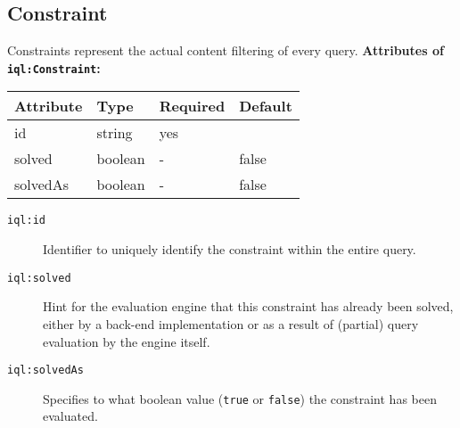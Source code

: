 \documentclass[11pt]{article}
\newcommand{\iqlns}{iql:}
\newcommand{\iqlType}[1]{\texttt{\iqlns#1}}
\newcommand{\attributes}[1]{\noindent\textbf{Attributes of \iqlType{#1}:}\newline\medskip}
\newcommand{\desc}[1]{\noindent#1\newline\medskip}
\begin{document}
\subsection{Constraint}
\label{sec:json-ld-constraint}
\desc{Constraints represent the actual content filtering of every query.}
\attributes{Constraint}
\begin{tabular}{|p{}|p{}|p{}|p{}|}
	\hline
	\textbf{Attribute} & \textbf{Type} & \textbf{Required} & \textbf{Default} \\ 
	\hline
	\hline
	id & string & yes &  \\ 
	\hline 
	solved & boolean & - & false \\ 
	\hline 
	solvedAs & boolean & - & false \\ 
	\hline 
\end{tabular}
\begin{description}
\item[\iqlType{id}] Identifier to uniquely identify the constraint within the entire query.
\item[\iqlType{solved}] Hint for the evaluation engine that this constraint has already been solved, either by a back-end implementation or as a result of (partial) query evaluation by the engine itself.
\item[\iqlType{solvedAs}] Specifies to what boolean value (\texttt{true} or \texttt{false}) the constraint has been evaluated.
\end{description}

\end{document}
